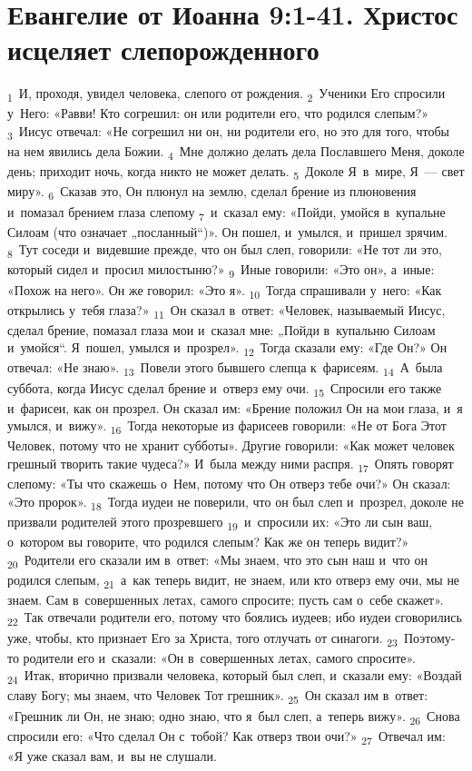\documentclass[a4paper,12pt]{article}
\begin{document}

\section{Евангелие от Иоанна 9:1-41. Христос исцеляет слепорожденного}

\textsubscript{1}~И, проходя, увидел человека, слепого от рождения. \textsubscript{2}~Ученики Его спросили у~Него: «Равви! Кто согрешил: он или родители его, что родился слепым?» \textsubscript{3}~Иисус отвечал: «Не согрешил ни он, ни родители его, но это для того, чтобы на нем явились дела Божии. \textsubscript{4}~Мне должно делать дела Пославшего Меня, доколе день; приходит ночь, когда никто не может делать. \textsubscript{5}~Доколе Я~в~мире, Я~— свет миру». \textsubscript{6}~Сказав это, Он плюнул на землю, сделал брение из плюновения и~помазал брением глаза слепому \textsubscript{7}~и~сказал ему: «Пойди, умойся в~купальне Силоам (что означает „посланный“)». Он пошел, и~умылся, и~пришел зрячим. \textsubscript{8}~Тут соседи и~видевшие прежде, что он был слеп, говорили: «Не тот ли это, который сидел и~просил милостыню?» \textsubscript{9}~Иные говорили: «Это он», а~иные: «Похож на него». Он же говорил: «Это я». \textsubscript{10}~Тогда спрашивали у~него: «Как открылись у~тебя глаза?» \textsubscript{11}~Он сказал в~ответ: «Человек, называемый Иисус, сделал брение, помазал глаза мои и~сказал мне: „Пойди в~купальню Силоам и~умойся“. Я~пошел, умылся и~прозрел». \textsubscript{12}~Тогда сказали ему: «Где Он?» Он отвечал: «Не знаю». \textsubscript{13}~Повели этого бывшего слепца к~фарисеям. \textsubscript{14}~А~была суббота, когда Иисус сделал брение и~отверз ему очи. \textsubscript{15}~Спросили его также и~фарисеи, как он прозрел. Он сказал им: «Брение положил Он на мои глаза, и~я умылся, и~вижу». \textsubscript{16}~Тогда некоторые из фарисеев говорили: «Не от Бога Этот Человек, потому что не хранит субботы». Другие говорили: «Как может человек грешный творить такие чудеса?» И~была между ними распря. \textsubscript{17}~Опять говорят слепому: «Ты что скажешь о~Нем, потому что Он отверз тебе очи?» Он сказал: «Это пророк». \textsubscript{18}~Тогда иудеи не поверили, что он был слеп и~прозрел, доколе не призвали родителей этого прозревшего \textsubscript{19}~и~спросили их: «Это ли сын ваш, о~котором вы говорите, что родился слепым? Как же он теперь видит?» \textsubscript{20}~Родители его сказали им в~ответ: «Мы знаем, что это сын наш и~что он родился слепым, \textsubscript{21}~а~как теперь видит, не знаем, или кто отверз ему очи, мы не знаем. Сам в~совершенных летах, самого спросите; пусть сам о~себе скажет». \textsubscript{22}~Так отвечали родители его, потому что боялись иудеев; ибо иудеи сговорились уже, чтобы, кто признает Его за Христа, того отлучать от синагоги. \textsubscript{23}~Поэтому-то родители его и~сказали: «Он в~совершенных летах, самого спросите». \textsubscript{24}~Итак, вторично призвали человека, который был слеп, и~сказали ему: «Воздай славу Богу; мы знаем, что Человек Тот грешник». \textsubscript{25}~Он сказал им в~ответ: «Грешник ли Он, не знаю; одно знаю, что я~был слеп, а~теперь вижу». \textsubscript{26}~Снова спросили его: «Что сделал Он с~тобой? Как отверз твои очи?» \textsubscript{27}~Отвечал им: «Я уже сказал вам, и~вы не слушали. 
\end{document}
